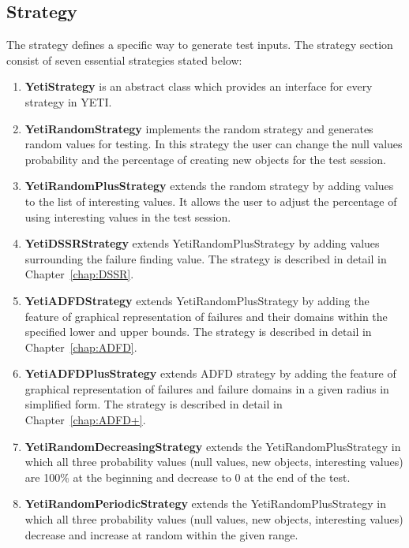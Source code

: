 \subsection{Strategy}
The strategy defines a specific way to generate test inputs. The strategy section consist of seven essential strategies stated below:
\begin{enumerate}
\item {\textbf{YetiStrategy}} is an abstract class which provides an interface for every strategy in YETI.
\item {\textbf{YetiRandomStrategy}} implements the random strategy and generates random values for testing. In this strategy the user can change the null values probability and the percentage of creating new objects for the test session. 
\item {\textbf{YetiRandomPlusStrategy}} extends the random strategy by adding values to the list of interesting values. It allows the user to adjust the percentage of using interesting values in the test session.
\item {\textbf{YetiDSSRStrategy}} extends YetiRandomPlusStrategy by adding values surrounding the failure finding value. The strategy is described in detail in Chapter~\ref{chap:DSSR}.
\item {\textbf{YetiADFDStrategy}} extends YetiRandomPlusStrategy by adding the feature of graphical representation of failures and their domains within the specified lower and upper bounds. The strategy is described in detail in Chapter~\ref{chap:ADFD}.
\item {\textbf{YetiADFDPlusStrategy}} extends ADFD strategy by adding the feature of graphical representation of failures and failure domains in a given radius in simplified form. The strategy is described in detail in Chapter~\ref{chap:ADFD+}.
\item {\textbf{YetiRandomDecreasingStrategy}} extends the YetiRandomPlusStrategy in which all three probability values (null values, new objects, interesting values) are 100\% at the beginning and decrease to 0 at the end of the test.
\item {\textbf{YetiRandomPeriodicStrategy}} extends the YetiRandomPlusStrategy in which all three probability values (null values, new objects, interesting values) decrease and increase at random within the given range.
\end{enumerate}






